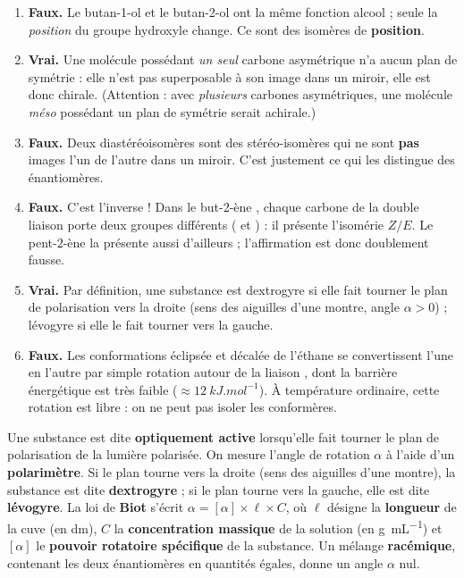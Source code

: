 \documentclass[11pt]{article}
\begin{document}
\begin{corrige}
\begin{enumerate}
\item \textbf{Faux.} Le butan-1-ol  et le butan-2-ol  ont la même fonction alcool ; seule la \emph{position} du groupe hydroxyle change. Ce sont des isomères de \textbf{position}.
\item \textbf{Vrai.} Une molécule possédant \emph{un seul} carbone asymétrique n'a aucun plan de symétrie : elle n'est pas superposable à son image dans un miroir, elle est donc chirale. (Attention : avec \emph{plusieurs} carbones asymétriques, une molécule \emph{méso} possédant un plan de symétrie serait achirale.)
\item \textbf{Faux.} Deux diastéréoisomères sont des stéréo-isomères qui ne sont \textbf{pas} images l'un de l'autre dans un miroir. C'est justement ce qui les distingue des énantiomères.
\item \textbf{Faux.} C'est l'inverse ! Dans le but-2-ène , chaque carbone de la double liaison porte deux groupes différents ( et ) : il présente l'isomérie $Z/E$. Le pent-2-ène  la présente aussi d'ailleurs ; l'affirmation est donc doublement fausse.
\item \textbf{Vrai.} Par définition, une substance est dextrogyre si elle fait tourner le plan de polarisation vers la droite (sens des aiguilles d'une montre, angle $\alpha > 0$) ; lévogyre si elle le fait tourner vers la gauche.
\item \textbf{Faux.} Les conformations éclipsée et décalée de l'éthane se convertissent l'une en l'autre par simple rotation autour de la liaison , dont la barrière énergétique est très faible ($\approx \SI{12}{kJ.mol^{-1}}$). À température ordinaire, cette rotation est libre : on ne peut pas isoler les conformères.
\end{enumerate}
\end{corrige}

\begin{corrige}
Une substance est dite \textbf{optiquement active} lorsqu'elle fait tourner le plan de polarisation de la lumière polarisée. On mesure l'angle de rotation $\alpha$ à l'aide d'un \textbf{polarimètre}. Si le plan tourne vers la droite (sens des aiguilles d'une montre), la substance est dite \textbf{dextrogyre} ; si le plan tourne vers la gauche, elle est dite \textbf{lévogyre}. La loi de \textbf{Biot} s'écrit $\alpha = [\alpha] \times \ell \times C$, où $\ell$ désigne la \textbf{longueur} de la cuve (en dm), $C$ la \textbf{concentration massique} de la solution (en \si{g.mL^{-1}}) et $[\alpha]$ le \textbf{pouvoir rotatoire spécifique} de la substance. Un mélange \textbf{racémique}, contenant les deux énantiomères en quantités égales, donne un angle $\alpha$ nul.
\end{corrige}
\end{document}
